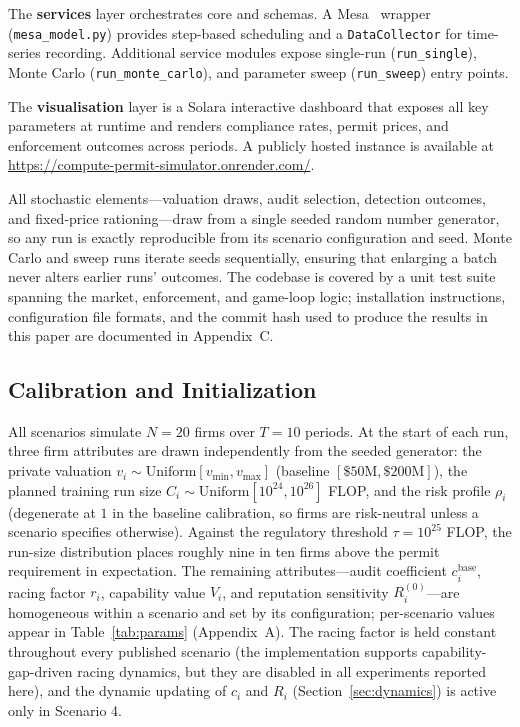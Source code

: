 The \textbf{services} layer orchestrates core and schemas. A Mesa~\cite{ter2025mesa} wrapper (\texttt{mesa\_model.py}) provides step-based scheduling and a \texttt{DataCollector} for time-series recording. Additional service modules expose single-run (\texttt{run\_single}), Monte Carlo (\texttt{run\_monte\_carlo}), and parameter sweep (\texttt{run\_sweep}) entry points.

The \textbf{visualisation} layer is a Solara interactive dashboard that exposes all key parameters at runtime and renders compliance rates, permit prices, and enforcement outcomes across periods. A publicly hosted instance is available at \url{https://compute-permit-simulator.onrender.com/}.

All stochastic elements---valuation draws, audit selection, detection outcomes, and fixed-price rationing---draw from a single seeded random number generator, so any run is exactly reproducible from its scenario configuration and seed. Monte Carlo and sweep runs iterate seeds sequentially, ensuring that enlarging a batch never alters earlier runs' outcomes. The codebase is covered by a unit test suite spanning the market, enforcement, and game-loop logic; installation instructions, configuration file formats, and the commit hash used to produce the results in this paper are documented in Appendix~C.

\subsection{Calibration and Initialization}
\label{sec:calibration}

All scenarios simulate $N = 20$ firms over $T = 10$ periods. At the start of each run, three firm attributes are drawn independently from the seeded generator: the private valuation $v_i \sim \mathrm{Uniform}[v_{\min}, v_{\max}]$ (baseline $[\$50\text{M}, \$200\text{M}]$), the planned training run size $C_i \sim \mathrm{Uniform}[10^{24}, 10^{26}]$ FLOP, and the risk profile $\rho_i$ (degenerate at $1$ in the baseline calibration, so firms are risk-neutral unless a scenario specifies otherwise). Against the regulatory threshold $\tau = 10^{25}$ FLOP, the run-size distribution places roughly nine in ten firms above the permit requirement in expectation. The remaining attributes---audit coefficient $c_i^{\mathrm{base}}$, racing factor $r_i$, capability value $V_i$, and reputation sensitivity $R_i^{(0)}$---are homogeneous within a scenario and set by its configuration; per-scenario values appear in Table~\ref{tab:params} (Appendix~A). The racing factor is held constant throughout every published scenario (the implementation supports capability-gap-driven racing dynamics, but they are disabled in all experiments reported here), and the dynamic updating of $c_i$ and $R_i$ (Section~\ref{sec:dynamics}) is active only in Scenario 4.

